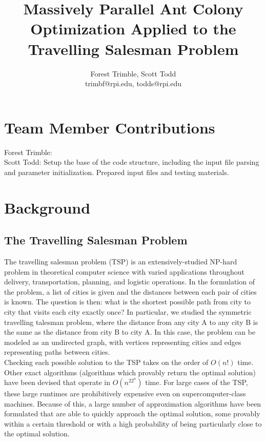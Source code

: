 \documentclass[twocolumn]{article}
\title{Massively Parallel Ant Colony Optimization Applied to the Travelling Salesman Problem}
\author{Forest Trimble, Scott Todd\\trimbf@rpi.edu, todds@rpi.edu}
\begin{document}
\maketitle

\pagestyle{fancy}
\fancyhead{}
\fancyfoot{}
\fancyhead[R]{\thepage}


\section{Team Member Contributions}

Forest Trimble: \\

\noindent Scott Todd: Setup the base of the code structure, including the input
file parsing and parameter initialization. Prepared input files and testing
materials.



\section{Background}

\subsection{The Travelling Salesman Problem}

The travelling salesman problem (TSP) is an extensively-studied NP-hard problem 
in theoretical computer science with varied applications throughout delivery, 
transportation, planning, and logistic operations. In the formulation of the 
problem, a list of cities is given and the distances between each pair of cities
is known. The question is then: what is the shortest possible path from city to
city that visits each city exactly once? In particular, we studied the symmetric
travelling talesman problem, where the distance from any city A to any city B
is the same as the distance from city B to city A. In this case, the problem
can be modeled as an undirected graph, with vertices representing cities and
edges representing paths between cities.\\

Checking each possible solution to the TSP takes on the order of $O(n!)$ time. 
Other exact algorithms (algorithms which provably return the optimal solution) 
have been devised that operate in $O(n^22^n)$ time. For large cases of the TSP, 
these large runtimes are prohibitively expensive even on supercomputer-class 
machines. Because of this, a large number of approximation algorithms have been 
formulated that are able to quickly approach the optimal solution, some provably
within a certain threshold or with a high probability of being particularly
close to the optimal solution.\\
\end{document}
